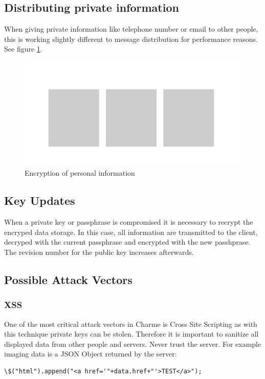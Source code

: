 \documentclass{scrartcl}
\begin{document}
  \subsection{Distributing private information}
  When giving private information like telephone number or email to other people, this is working slightly different to message distribution for performance reasons. See figure \ref{fig3}.
   \begin{figure}[ht]
	\centering
  \includegraphics[]{prvInfo.pdf}
	\caption{Encryption of personal information}
	\label{fig3}
\end{figure}
  
    \subsection{Key Updates}
    When a private key or passphrase is compromised  it is necessary to recrypt the encryped data storage. In this case, all information are transmitted to the client, decryped with the current passphrase and encrypted with the new passhprase. The revision number for the public key increases afterwards.

  \subsection{Possible Attack Vectors}
   \subsubsection{XSS}
   One of the most critical attack vectors in Charme is Cross Site Scripting as with this technique private keys can be stolen.
   Therefore it is important to sanitize all displayed data from other people and servers. Never trust the server. For example imaging data is a JSON Object returned by the server:
   
       \begin{lstlisting}
\$("html").append("<a href='"+data.href+"'>TEST</a>");
    \end{lstlisting}
    
\end{document}
